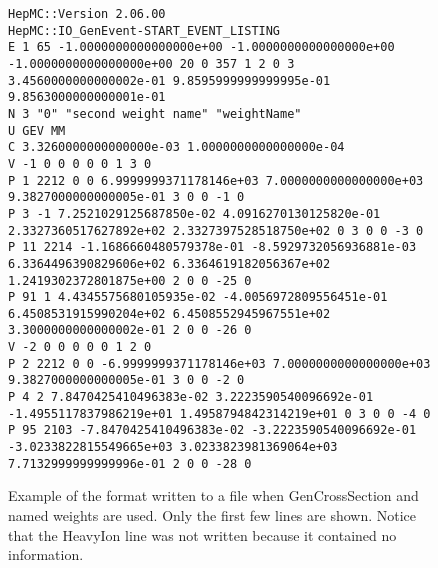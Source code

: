\documentclass[11pt,letterpaper]{article}
\begin{document}
\begin{figure}[h]
  \begin{center}
{\tiny \begin{verbatim}
HepMC::Version 2.06.00
HepMC::IO_GenEvent-START_EVENT_LISTING
E 1 65 -1.0000000000000000e+00 -1.0000000000000000e+00 -1.0000000000000000e+00 20 0 357 1 2 0 3 3.4560000000000002e-01 9.8595999999999995e-01 9.8563000000000001e-01
N 3 "0" "second weight name" "weightName" 
U GEV MM
C 3.3260000000000000e-03 1.0000000000000000e-04
V -1 0 0 0 0 0 1 3 0
P 1 2212 0 0 6.9999999371178146e+03 7.0000000000000000e+03 9.3827000000000005e-01 3 0 0 -1 0
P 3 -1 7.2521029125687850e-02 4.0916270130125820e-01 2.3327360517627892e+02 2.3327397528518750e+02 0 3 0 0 -3 0
P 11 2214 -1.1686660480579378e-01 -8.5929732056936881e-03 6.3364496390829606e+02 6.3364619182056367e+02 1.2419302372801875e+00 2 0 0 -25 0
P 91 1 4.4345575680105935e-02 -4.0056972809556451e-01 6.4508531915990204e+02 6.4508552945967551e+02 3.3000000000000002e-01 2 0 0 -26 0
V -2 0 0 0 0 0 1 2 0
P 2 2212 0 0 -6.9999999371178146e+03 7.0000000000000000e+03 9.3827000000000005e-01 3 0 0 -2 0
P 4 2 7.8470425410496383e-02 3.2223590540096692e-01 -1.4955117837986219e+01 1.4958794842314219e+01 0 3 0 0 -4 0
P 95 2103 -7.8470425410496383e-02 -3.2223590540096692e-01 -3.0233822815549665e+03 3.0233823981369064e+03 7.7132999999999996e-01 2 0 0 -28 0
\end{verbatim}}
  \end{center}
  \caption[Example of ascii format]
          {\label{ascii_cross} Example of the format written to a file
	   when GenCrossSection and named weights are used.
           Only the first few lines are shown. 
	   Notice that the HeavyIon line was not written because it contained
	   no information. }
\end{figure}
\end{document}
